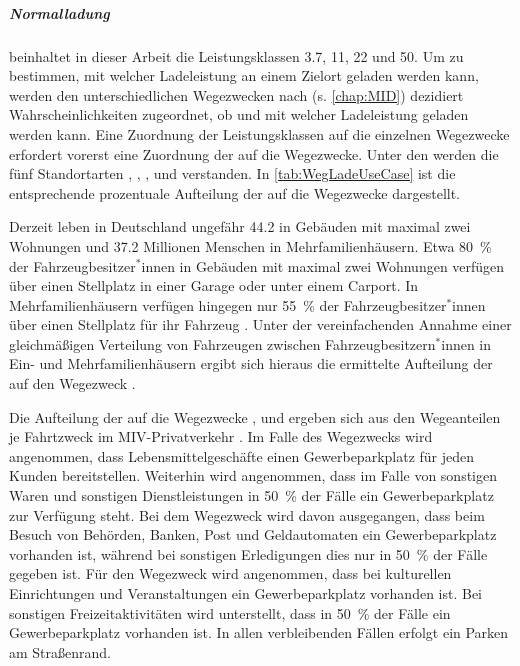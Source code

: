 \subparagraph{Normalladung} beinhaltet in dieser Arbeit die Leistungsklassen \SI{3.7}{\kw}, \SI{11}{\kw}, \SI{22}{\kw} und \SI{50}{\kw}.
Um zu bestimmen, mit welcher Ladeleistung an einem Zielort geladen werden kann, werden den unterschiedlichen Wegezwecken nach  (s. \autoref{chap:MID}) dezidiert Wahrscheinlichkeiten zugeordnet, ob und mit welcher Ladeleistung geladen werden kann.
Eine Zuordnung der Leistungsklassen auf die einzelnen Wegezwecke erfordert vorerst eine Zuordnung der \UCs auf die Wegezwecke.
Unter den \UCs werden die fünf Standortarten \Eigenheimdot, \Wohnanlagedot, \Firmeparkplatzdot, \Gewerbeparkplatz und \Straszenrand verstanden.
In \autoref{tab:WegLadeUseCase} ist die entsprechende prozentuale Aufteilung der \UCs auf die Wegezwecke dargestellt.



Derzeit leben in Deutschland ungefähr \SI{44.2}{\MioMen} in Gebäuden mit maximal zwei Wohnungen und \num{37.2} Millionen Menschen in Mehrfamilienhäusern.
Etwa \SI{80}{\percent} der \linebreak Fahrzeugbesitzer$^*$innen in Gebäuden mit maximal zwei Wohnungen verfügen über einen Stellplatz in einer Garage oder unter einem Carport.
In Mehrfamilienhäusern verfügen hingegen nur \SI{55}{\percent} der Fahrzeugbesitzer$^*$innen über einen Stellplatz für ihr Fahrzeug \cite{dena2020}.
Unter der vereinfachenden Annahme einer gleichmäßigen Verteilung von Fahrzeugen zwischen Fahrzeugbesitzern$^*$innen in Ein- und Mehrfamilienhäusern ergibt sich hieraus die ermittelte Aufteilung der \UCs auf den Wegezweck \nHdot.\medskip

Die Aufteilung der \UCs auf die Wegezwecke \Einkaufdot, \Erledigung und \Freizeit ergeben sich aus den Wegeanteilen je Fahrtzweck im \gls{MIV}-Privatverkehr \cite{Rikus2015}.
Im Falle des Wegezwecks \Einkauf wird angenommen, dass Lebensmittelgeschäfte einen Gewerbeparkplatz für jeden Kunden bereitstellen.
Weiterhin wird angenommen, dass im Falle von sonstigen Waren und sonstigen Dienstleistungen in \SI{50}{\percent} der Fälle ein Gewerbeparkplatz zur Verfügung steht.
Bei dem Wegezweck \Erledigung wird davon ausgegangen, dass beim Besuch von Behörden, Banken, Post und Geldautomaten ein Gewerbeparkplatz vorhanden ist, während bei sonstigen Erledigungen dies nur in \SI{50}{\percent} der Fälle gegeben ist.
Für den Wegezweck \Freizeit wird angenommen, dass bei kulturellen Einrichtungen und Veranstaltungen ein Gewerbeparkplatz vorhanden ist.
Bei sonstigen Freizeitaktivitäten wird unterstellt, dass in \SI{50}{\percent} der Fälle ein Gewerbeparkplatz vorhanden ist.
In allen verbleibenden Fällen erfolgt ein Parken am Straßenrand.\medskip

